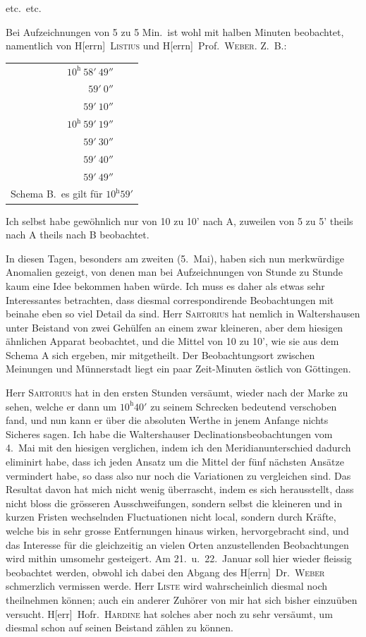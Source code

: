 \documentclass[12pt,a4paper]{article}
\begin{document}
etc.~etc.

Bei Aufzeichnungen von 5 zu 5 Min.~ist wohl mit halben Minuten beobachtet, namentlich von H[errn]~\textsc{Listius} und H[errn]~Prof.~\textsc{Weber}. Z.~B.:

\begin{center}
\begin{tabular}{r@{\ }l}
$10^{\mathrm{h}}\ 58'\ 49''$ & \\
$59'\ 0''$ & \\
$59'\ 10''$ & \\
$10^{\mathrm{h}}\ 59'\ 19''$ & \\
$59'\ 30''$ & \\
$59'\ 40''$ & \\
$59'\ 49''$ & \\
\hline
\multicolumn{2}{l}{Schema B.~es gilt f\"ur $10^{\mathrm{h}} 59'$}
\end{tabular}
\end{center}

Ich selbst habe gew\"ohnlich nur von 10 zu 10' nach A, zuweilen von 5 zu 5' theils nach A theils nach B beobachtet.

In diesen Tagen, besonders am zweiten (5.~Mai), haben sich nun merkw\"urdige Anomalien gezeigt, von denen man bei Aufzeichnungen von Stunde zu Stunde kaum eine Idee bekommen haben w\"urde. Ich muss es daher als etwas sehr Interessantes betrachten, dass diesmal correspondirende Beobachtungen mit beinahe eben so viel Detail da sind. Herr \textsc{Sartorius} hat nemlich in Waltershausen unter Beistand von zwei Geh\"ulfen an einem zwar kleineren, aber dem hiesigen \"ahnlichen Apparat beobachtet, und die Mittel von 10 zu 10', wie sie aus dem Schema A sich ergeben, mir mitgetheilt. Der Beobachtungsort zwischen Meinungen und M\"unnerstadt liegt ein paar Zeit-Minuten \"ostlich von G\"ottingen.

Herr \textsc{Sartorius} hat in den ersten Stunden vers\"aumt, wieder nach der Marke zu sehen, welche er dann um $10^{\mathrm{h}} 40'$ zu seinem Schrecken bedeutend verschoben fand, und nun kann er \"uber die absoluten Werthe in jenem Anfange nichts Sicheres sagen. Ich habe die Waltershauser Declinationsbeobachtungen vom 4.~Mai mit den hiesigen verglichen, indem ich den Meridianunterschied dadurch eliminirt habe, dass ich jeden Ansatz um die Mittel der f\"unf n\"achsten Ans\"atze vermindert habe, so dass also nur noch die Variationen zu vergleichen sind. Das Resultat davon hat mich nicht wenig \"uberrascht, indem es sich herausstellt, dass nicht bloss die gr\"osseren Ausschweifungen, sondern selbst die kleineren und in kurzen Fristen wechselnden Fluctuationen nicht local, sondern durch Kr\"afte, welche bis in sehr grosse Entfernungen hinaus wirken, hervorgebracht sind, und das Interesse f\"ur die gleichzeitig an vielen Orten anzustellenden Beobachtungen wird mithin umsomehr gesteigert. Am 21.~u.~22.~Januar soll hier wieder fleissig beobachtet werden, obwohl ich dabei den Abgang des H[errn]~Dr.~\textsc{Weber} schmerzlich vermissen werde. Herr \textsc{Liste} wird wahrscheinlich diesmal noch theilnehmen k\"onnen; auch ein anderer Zuh\"orer von mir hat sich bisher einzu\"uben versucht. H[err]~Hofr.~\textsc{Hardine} hat solches aber noch zu sehr vers\"aumt, um diesmal schon auf seinen Beistand z\"ahlen zu k\"onnen.
\end{document}
